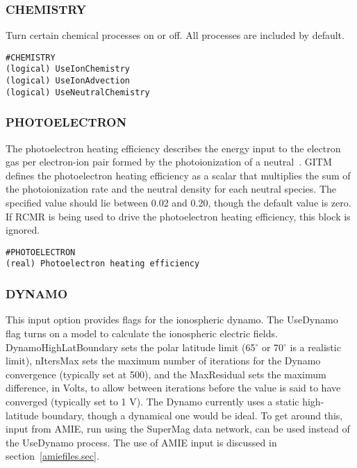 \subsubsection{CHEMISTRY}

Turn certain chemical processes on or off.  All processes are included by default.

\begin{verbatim}
#CHEMISTRY
(logical) UseIonChemistry         
(logical) UseIonAdvection
(logical) UseNeutralChemistry
\end{verbatim}

\subsubsection{PHOTOELECTRON}
\label{photoelectron.sec}

The photoelectron heating efficiency describes the energy input to the electron gas per electron-ion pair formed by the photoionization of a neutral~\citep{Hanson:1968ue}.  GITM defines the photoelectron heating efficiency as a scalar that multiplies the sum of the photoionization rate and the neutral density for each neutral species.  The specified value should lie between 0.02 and 0.20, though the default value is zero.  If RCMR is being used to drive the photoelectron heating efficiency, this block is ignored.

\begin{verbatim}
#PHOTOELECTRON
(real) Photoelectron heating efficiency
\end{verbatim}

\subsubsection{DYNAMO}
\label{dynamo.sec}

This input option provides flags for the ionospheric dynamo.  The UseDynamo flag turns on a model to calculate the ionospheric electric fields.  DynamoHighLatBoundary sets the polar latitude limit (65$^\circ$ or 70$^\circ$ is a realistic limit), nItersMax sets the maximum number of iterations for the Dynamo convergence (typically set at 500), and the MaxResidual sets the maximum difference, in Volts, to allow between iterations before the value is said to have converged (typically set to 1 V).  The Dynamo currently uses a static high-latitude boundary, though a dynamical one would be ideal.  To get around this, input from AMIE, run using the SuperMag data network, can be used instead of the UseDynamo process.  The use of AMIE input is discussed in section~\ref{amiefiles.sec}.

